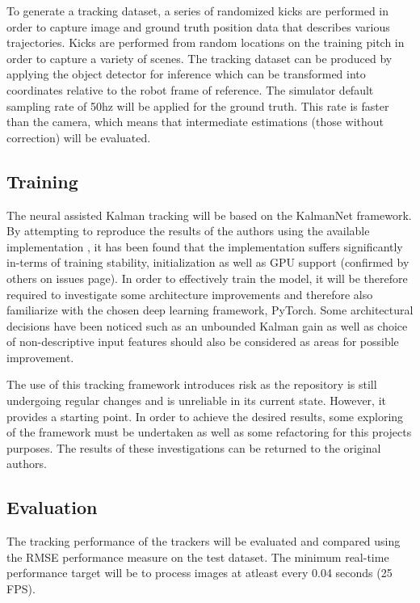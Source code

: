 \documentclass[a4paper,twoside,12pt]{report}
\begin{document}
To generate a tracking dataset, a series of randomized kicks are performed in order to capture image and ground truth position data that describes various trajectories. Kicks are performed from random locations on the training pitch in order to capture a variety of scenes. The tracking dataset can be produced by applying the object detector for inference which can be transformed into coordinates relative to the robot frame of reference. The simulator default sampling rate of 50hz will be applied for the ground truth. This rate is faster than the camera, which means that intermediate estimations (those without correction) will be evaluated.

\subsection{Training}
The neural assisted Kalman tracking will be based on the KalmanNet framework. By attempting to reproduce the results of the authors using the available implementation \cite{kalmangit}, it has been found that the implementation suffers significantly in-terms of training stability, initialization as well as GPU support (confirmed by others on issues page). In order to effectively train the model, it will be therefore required to investigate some architecture improvements and therefore  also familiarize with the chosen deep learning framework, PyTorch. Some architectural decisions have been noticed such as an unbounded Kalman gain as well as choice of non-descriptive input features should also be considered as areas for possible improvement.  

The use of this tracking framework introduces risk as the repository is still undergoing regular changes and is unreliable in its current state. However, it provides a starting point. In order to achieve the desired results, some exploring of the framework must be undertaken as well as some refactoring for this projects purposes. The results of these investigations can be returned to the original authors.

\subsection{Evaluation}

The tracking performance of the trackers will be evaluated and compared using the RMSE performance measure on the test dataset. The minimum real-time performance target will be to process images at atleast every 0.04 seconds (25 FPS).
\end{document}
